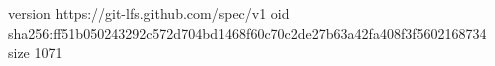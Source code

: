 version https://git-lfs.github.com/spec/v1
oid sha256:ff51b050243292c572d704bd1468f60c70c2de27b63a42fa408f3f5602168734
size 1071
